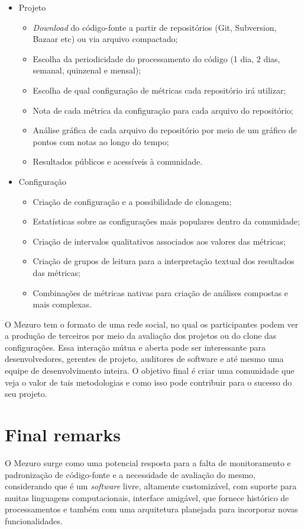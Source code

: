 \documentclass{llncs}
\begin{document}
\begin{itemize}
  \item Projeto
    \begin{itemize}
    \item \textit{Download} do código-fonte a partir de repositórios (Git, Subversion, Bazaar etc) ou via arquivo compactado;
        \item Escolha da periodicidade do processamento do código (1 dia, 2 dias, semanal, quinzenal e mensal);
        \item Escolha de qual configuração de métricas cada repositório irá utilizar;
        \item Nota de cada métrica da configuração para cada arquivo do repositório;
        \item Análise gráfica de cada arquivo do repositório por meio de um gráfico de pontos com notas ao longo do tempo;
        \item Resultados públicos e acessíveis à comunidade.
    \end{itemize}
    \item Configuração
    \begin{itemize}
    \item Criação de configuração e a possibilidade de clonagem;
        \item Estatísticas sobre as configurações mais populares dentro da comunidade;
        \item Criação de intervalos qualitativos associados aos valores das métricas;
        \item Criação de grupos de leitura para a interpretação textual dos resultados das métricas;
        \item Combinações de métricas nativas para criação de análises compostas e mais complexas.
    \end{itemize}
\end{itemize}


O Mezuro tem o formato de uma rede social, no qual os participantes podem ver a
produção de terceiros por meio da avaliação dos projetos ou do clone das
configurações. Essa interação mútua e aberta pode ser interessante para
desenvolvedores, gerentes de projeto, auditores de software e até
mesmo uma equipe de desenvolvimento inteira. O objetivo final é criar uma
comunidade que veja o valor de tais metodologias e como isso pode contribuir
para o sucesso do seu projeto.

\section{Final remarks}

O Mezuro surge como uma potencial resposta para a falta de monitoramento e
padronização de código-fonte e a necessidade de avaliação do mesmo,
considerando que é um \textit{software} livre, altamente customizável, com
suporte para muitas linguagens computacionais, interface amigável, que fornece
histórico de processamentos e também com uma arquitetura planejada para
incorporar novas funcionalidades.




\end{document}
